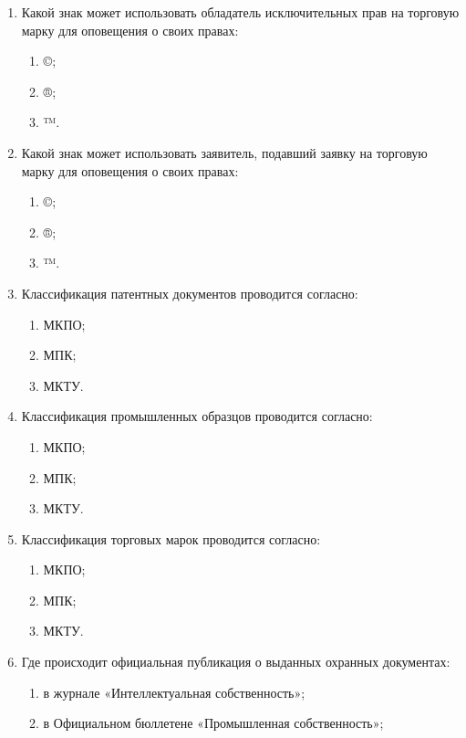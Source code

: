 \begin{enumerate}
\begin{enumerate}
    \end{enumerate}
    \item Какой знак может использовать обладатель исключительных прав на торговую марку для оповещения о своих правах:
    \begin{enumerate}
        \item ©;
        \item ®;
        \item \cmark ™.
    \end{enumerate}
    \item Какой знак может использовать заявитель, подавший заявку на торговую марку для оповещения о своих правах:
    \begin{enumerate}
        \item ©;
        \item \cmark ®;
        \item ™.
    \end{enumerate}
    \item Классификация патентных документов проводится согласно:
    \begin{enumerate}
        \item МКПО;
        \item \cmark МПК;
        \item МКТУ.
    \end{enumerate}
    \item Классификация промышленных образцов проводится согласно:
    \begin{enumerate}
        \item \cmark МКПО;
        \item МПК;
        \item МКТУ.
    \end{enumerate}
    \item Классификация торговых марок проводится согласно:
    \begin{enumerate}
        \item МКПО;
        \item МПК;
        \item \cmark МКТУ.
    \end{enumerate}
    \item Где происходит официальная публикация о выданных охранных документах:
    \begin{enumerate}
        \item в журнале «Интеллектуальная собственность»;
        \item \cmark в Официальном бюллетене «Промышленная собственность»;

\end{enumerate}
\end{enumerate}
